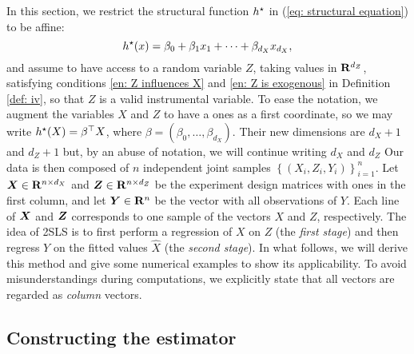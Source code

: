 In this section, we restrict the structural function $ h^{ \star } $ in (\ref{eq: structural equation}) to be affine:
\begin{equation}
    \label{}
    h^{ \star } ( x ) = \beta_{ 0 } + \beta_{ 1 } x_{ 1 } + \cdots + \beta_{ d_{ X } } x_{ d_{ X } }
,\end{equation}
and assume to have access to a random variable $ Z $, taking values in $ \mathbf{R}^{ d_{ Z } } $, satisfying conditions \ref{en: Z influences X} and \ref{en: Z is exogenous} in Definition \ref{def: iv}, so that $ Z $ is a valid instrumental variable.
To ease the notation, we augment the variables $ X $ and $ Z $ to have a ones as a first coordinate, so we may write $ h^{ \star } ( X ) = \beta^{ \top } X $, where $ \beta = ( \beta_{ 0 }, \dots, \beta_{ d_{ X } } ) $.
Their new dimensions are $ d_{ X } + 1 $ and $ d_{ Z } + 1 $ but, by an abuse of notation, we will continue writing $ d_{ X } $ and $ d_{ Z } $
Our data is then composed of $ n $ independent joint samples $ \left\{ ( X_{ i }, Z_{ i }, Y_{ i } ) \right\}_{ i=1 }^{ n } $.
Let $ \boldsymbol X \in \mathbf{R}^{ n \times d_{ X } } $ and $ \boldsymbol Z \in \mathbf{R}^{ n \times d_{ Z } } $ be the experiment design matrices with ones in the first column, and let $ \boldsymbol Y \in \mathbf{R}^{ n } $ be the vector with all observations of $ Y $.
Each line of $ \boldsymbol X $ and $ \boldsymbol Z $ corresponds to one sample of the vectors $ X $ and $ Z $, respectively.
The idea of 2SLS is to first perform a regression of $ X $ on $ Z $ (the \emph{first stage}) and then regress $ Y $ on the fitted values $ \hat{ X } $ (the \emph{second stage}).
In what follows, we will derive this method and give some numerical examples to show its applicability.
To avoid misunderstandings during computations, we explicitly state that all vectors are regarded as \emph{column} vectors.

\subsection{Constructing the estimator}

